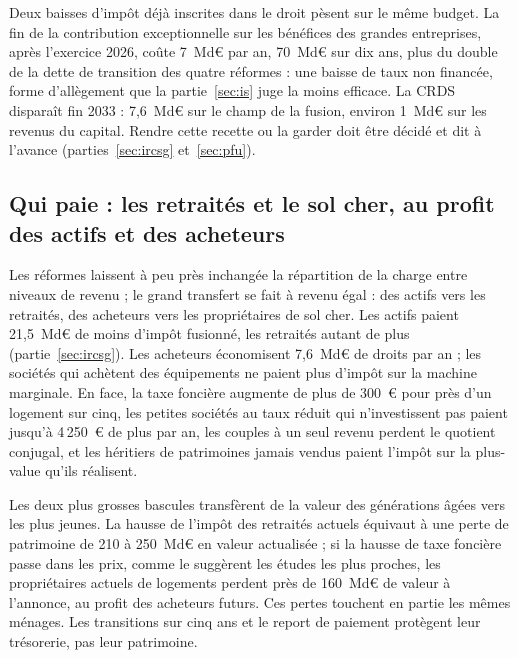 Deux baisses d'impôt déjà inscrites dans le droit pèsent sur le même budget. La fin de la contribution exceptionnelle
sur les bénéfices des grandes entreprises, après l'exercice 2026, coûte 7~Md€ par an, 70~Md€ sur dix ans, plus du
double de la dette de transition des quatre réformes : une baisse de taux non financée, forme d'allègement que la
partie~\ref{sec:is} juge la moins efficace. La CRDS disparaît fin 2033 : 7,6~Md€ sur le
champ de la fusion, environ 1~Md€ sur les revenus du capital. Rendre cette recette ou la garder doit être décidé et dit
à l'avance (parties~\ref{sec:ircsg} et~\ref{sec:pfu}).

\subsection{Qui paie : les retraités et le sol cher, au profit des actifs et des acheteurs}\label{sec:ens_gagnants}\label{sec:ens_cas}\label{sec:ens_haut}

Les réformes laissent à peu près inchangée la répartition de la charge entre niveaux de revenu ; le grand transfert se
fait à revenu égal : des actifs vers les retraités, des acheteurs vers les propriétaires de sol cher. Les actifs paient
21,5~Md€ de moins d'impôt fusionné, les retraités autant de plus (partie~\ref{sec:ircsg}). Les acheteurs économisent
7,6~Md€ de droits par an ; les sociétés qui achètent des équipements ne paient plus d'impôt sur la machine marginale. En
face, la taxe foncière augmente de plus de 300~€ pour près d'un logement sur cinq, les petites sociétés au taux réduit
qui n'investissent pas paient jusqu'à 4\,250~€ de plus par an, les couples à un seul revenu perdent le quotient
conjugal, et les héritiers de patrimoines jamais vendus paient l'impôt sur la plus-value qu'ils réalisent.

Les deux plus grosses bascules transfèrent de la valeur des générations âgées vers les plus jeunes. La hausse de
l'impôt des retraités actuels équivaut à une perte de patrimoine de 210 à 250~Md€ en valeur actualisée ; si la hausse
de taxe foncière passe dans les prix, comme le suggèrent les études les plus proches, les propriétaires actuels de
logements perdent près de 160~Md€ de valeur à l'annonce, au profit des acheteurs futurs. Ces pertes touchent en
partie les mêmes ménages. Les transitions sur cinq ans et le report de paiement protègent leur trésorerie, pas leur
patrimoine.



